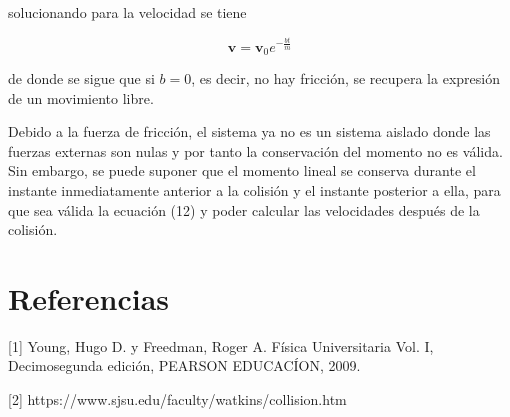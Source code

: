 \documentclass{article}
\begin{document}
 solucionando para la velocidad se tiene
 
 \begin{equation}
 \textbf{v} =  \textbf{v}_{0} e^{- \frac{bt}{m}}
 \end{equation}
 
 de donde se sigue que si $b=0$, es decir, no hay fricción, se recupera la expresión de un movimiento libre.
 
 Debido a la fuerza de fricción, el sistema ya no es un sistema aislado donde las fuerzas externas son nulas y por tanto la conservación del momento no es válida. Sin embargo, se puede suponer que el momento lineal se conserva durante el instante inmediatamente anterior a la colisión y el instante posterior a ella, para que sea válida la ecuación (12) y poder calcular las velocidades después de la colisión. 










\section{Referencias}
[1] Young, Hugo D. y Freedman, Roger A. Física Universitaria Vol. I, Decimosegunda edición, PEARSON EDUCACÍON, 2009.

[2] https://www.sjsu.edu/faculty/watkins/collision.htm
\end{document}

